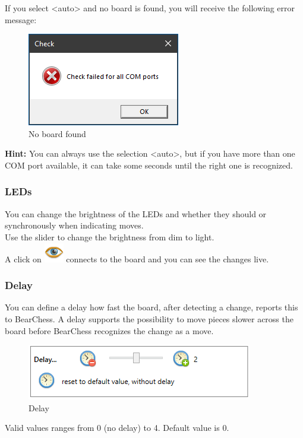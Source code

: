 \documentclass[11pt,a4paper]{article}
\begin{document}
If you select <auto> and no board is found, you will receive the following error message:

\begin{figure}[H]
	\centering
	\includegraphics[scale=1.0]{MillenniumChessLink5.png}
	\caption{No board found }
	\label{fig:MillenniumChessLink5}
\end{figure}

\textbf{Hint:} You can always use the selection <auto>, but if you have more than one COM port available, it can take some seconds until the right one is recognized.\\

\subsubsection{LEDs}
You can change the brightness of the LEDs and whether they should or synchronously when indicating moves.\\
Use the slider to change the brightness from dim to light.\\
A click on \includegraphics[scale=0.4]{eye.png} connects to the board and you can see the changes live.

\subsubsection{Delay}
You can define a delay how fast the board, after detecting a change, reports this to BearChess. A delay supports the possibility to move pieces slower across the board before BearChess recognizes the change as a move. \\
\begin{figure}[H]
	\centering
	\includegraphics[scale=1.0]{MillenniumChessLink11.png}
	\caption{Delay}
	\label{fig:MillenniumChessLink11}
\end{figure}
Valid values ranges from 0 (no delay) to 4. Default value is 0.
\end{document}
